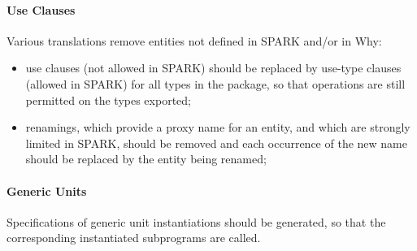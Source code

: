 \documentclass{article}
\begin{document}
\paragraph{Use Clauses}

Various translations remove entities not defined in SPARK and/or in Why:
\begin{itemize}
\item use clauses (not allowed in SPARK) should be replaced by use-type clauses
  (allowed in SPARK) for all types in the package, so that operations are still
  permitted on the types exported;
\item renamings, which provide a proxy name for an entity, and which are
  strongly limited in SPARK, should be removed and each occurrence of the
  new name should be replaced by the entity being renamed;
\end{itemize}

\paragraph{Generic Units}

Specifications of generic unit instantiations should be generated, so that the
corresponding instantiated subprograms are called.
\end{document}
